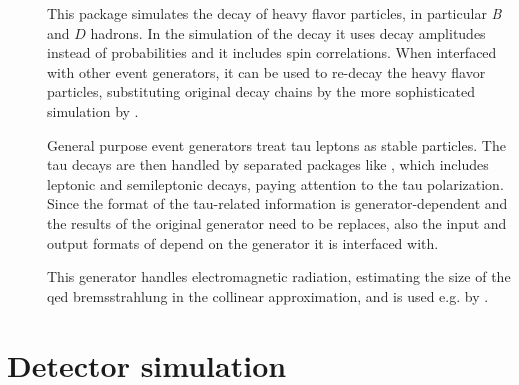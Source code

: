 \begin{description}
\item[\evtgen] \cite{Lange:2001uf} This package simulates the decay of heavy flavor particles, in particular \textit{B} and $D$ hadrons. 
In the simulation of the decay it uses decay amplitudes instead of probabilities and it includes spin correlations. 
When interfaced with other event generators, it can be used to re-decay the heavy flavor particles, 
substituting original decay chains by the more sophisticated simulation by \evtgen.

\item[\tauola] \cite{Jadach:1990mz} General purpose event generators treat tau leptons as stable particles. 
The tau decays are then handled by separated packages like \tauola, which includes leptonic and semileptonic decays, paying attention to the tau polarization. Since the format of the tau-related information is generator-dependent and the results of the original generator need to be replaces, also the input and output formats of \tauola depend on the generator it is interfaced with.

\item[\photos] \cite{Barberio:1990ms} This generator handles electromagnetic radiation, estimating the size of the \gls{qed} bremsstrahlung in the collinear approximation, and is used e.g. by \tauola. 


\end{description}


\section{Detector simulation}
\label{sec:detsim}

